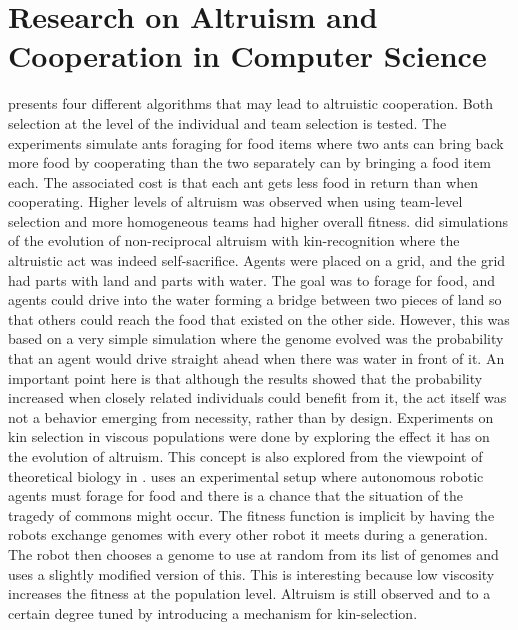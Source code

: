 \documentclass[a4paper]{book}
\begin{document}

\section{Research on Altruism and Cooperation in Computer Science}
\label{sec:cs}

\cite{floreano_evolution_2008} presents four different algorithms that may lead to altruistic cooperation. Both selection at the level of the individual and team selection is tested. The experiments simulate ants foraging for food items where two ants can bring back more food by cooperating than the two separately can by bringing a food item each. The associated cost is that each ant gets less food in return than when cooperating. Higher levels of altruism was observed when using team-level selection and more homogeneous teams had higher overall fitness. 
\cite{martijn_brinkers_evolution_1999} did simulations of the evolution of non-reciprocal altruism with kin-recognition where the altruistic act was indeed self-sacrifice. Agents were placed on a grid, and the grid had parts with land and parts with water. The goal was to forage for food, and agents could drive into the water forming a bridge between two pieces of land so that others could reach the food that existed on the other side. However, this was based on a very simple simulation where the genome evolved was the probability that an agent would drive straight ahead when there was water in front of it. An important point here is that although the results showed that the probability increased when closely related individuals could benefit from it, the act itself was not a behavior emerging from necessity, rather than by design. 
Experiments on kin selection in viscous populations were done by \cite{dulk_evolution_2000} exploring the effect it has on the evolution of altruism. This concept is also explored from the viewpoint of theoretical biology in \cite{joshua_mitteldorf_population_2000}. 
\cite{montanier_surviving_2011} uses an experimental setup where autonomous robotic agents must forage for food and there is a chance that the situation of the tragedy of commons might occur. The fitness function is implicit by having the robots exchange genomes with every other robot it meets during a generation. The robot then chooses a genome to use at random from its list of genomes and uses a slightly modified version of this. This is interesting because low viscosity increases the fitness at the population level. Altruism is still observed and to a certain degree tuned by introducing a mechanism for kin-selection. 
\end{document}
